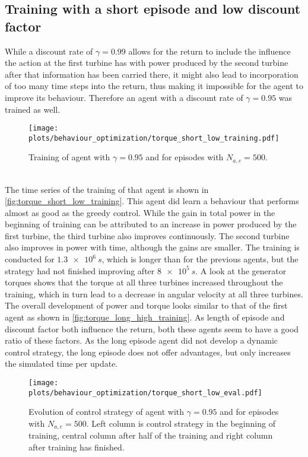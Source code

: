 \subsection{Training with a short episode and low discount factor}
While a discount rate of $\gamma=0.99$ allows for the return to include the influence the action at the first turbine has with power produced by the second turbine after that information has been carried there, it might also lead to incorporation of too many time steps into the return, thus making it impossible for the agent to improve its behaviour. Therefore an agent with a discount rate of $\gamma=0.95$ was trained as well.
\begin{figure}[h]
	\centering
	\texttt{[image: plots/behaviour\_optimization/torque\_short\_low\_training.pdf]}
	\caption{Training of agent with $\gamma=0.95$ and for episodes with $N_{a,e}=500$.}
	\label{fig:torque_short_low_training}
\end{figure} \\
The time series of the training of that agent is shown in \autoref{fig:torque_short_low_training}. This agent did learn a behaviour that performs almost as good as the greedy control. While the gain in total power in the beginning of training can be attributed to an increase in power produced by the first turbine, the third turbine also improves continuously. The second turbine also improves in power with time, although the gains are smaller. The training is conducted for $\SI{1.3e6}{s}$, which is longer than for the previous agents, but the strategy had not finished improving after $\SI{8e5}{s}$. A look at the generator torques shows that the torque at all three turbines increased throughout the training, which in turn lead to a decrease in angular velocity at all three turbines. The overall development of power and torque looks similar to that of the first agent as shown in \autoref{fig:torque_long_high_training}. As length of episode and discount factor both influence the return, both these agents seem to have a good ratio of these factors. As the long episode agent did not develop a dynamic control strategy, the long episode does not offer advantages, but only increases the simulated time per update. 
\begin{figure}[h]
	\centering
	\texttt{[image: plots/behaviour\_optimization/torque\_short\_low\_eval.pdf]}
	\caption{Evolution of control strategy of agent with $\gamma=0.95$ and for episodes with $N_{a,e}=500$. Left column is control strategy in the beginning of training, central column after half of the training and right column after training has finished.}
	\label{fig:torque_short_low_eval}
\end{figure} \\
